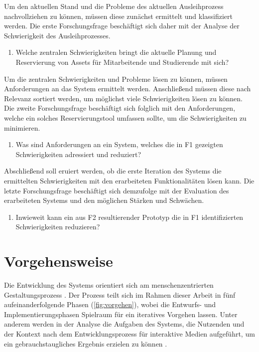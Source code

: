 Um den aktuellen Stand und die Probleme des aktuellen Ausleihprozess nachvollziehen zu können,
müssen diese zunächst ermittelt und klassifiziert werden. Die erste Forschungsfrage beschäftigt sich
daher mit der Analyse der Schwierigkeit des Ausleihprozesses.
\begin{enumerate}
  \item[\sffamily\color{maincolor} {F1 |}] {Welche zentralen Schwierigkeiten bringt die aktuelle Planung und Reservierung von Assets für Mitarbeitende und Studierende mit sich?}
\end{enumerate}
Um die zentralen Schwierigkeiten und Probleme lösen zu können, müssen Anforderungen an das System
ermittelt werden. Anschließend müssen diese nach Relevanz sortiert werden, um möglichst viele
Schwierigkeiten lösen zu können. Die zweite Forschungsfrage beschäftigt sich folglich mit den
Anforderungen, welche ein solches Reservierungstool umfassen sollte, um die Schwierigkeiten zu minimieren.
\begin{enumerate}
  \item[\sffamily\color{maincolor} {F2 |}] {Was sind Anforderungen an ein System, welches die in F1 gezeigten Schwierigkeiten adressiert und reduziert?}
\end{enumerate}
Abschließend soll eruiert werden, ob die erste Iteration des Systems die ermittelten Schwierigkeiten
mit den erarbeiteten Funktionalitäten lösen kann. Die letzte Forschungsfrage beschäftigt sich
demzufolge mit der Evaluation des erarbeiteten Systems und den möglichen Stärken und Schwächen.
\begin{enumerate}
  \item[\sffamily\color{maincolor} {F3 |}] {Inwieweit kann ein aus F2 resultierender Prototyp die in F1 identifizierten Schwierigkeiten reduzieren?}
\end{enumerate}

\section{Vorgehensweise}
Die Entwicklung des Systems orientiert sich am menschenzentrierten Gestaltungsprozess
\cite{DINISO9241}. Der Prozess teilt sich im Rahmen dieser Arbeit in
fünf aufeinanderfolgende Phasen (\ref{fig:vorgehen}), wobei die Entwurfs- und Implementierungsphasen
Spielraum für ein iteratives Vorgehen lassen. Unter anderem werden in der Analyse die Aufgaben des
Systems, die Nutzenden und der Kontext nach dem Entwicklungsprozess für interaktive Medien
aufgeführt, um ein gebrauchstaugliches Ergebnis erzielen zu können \cite{HerczegMDI2009}.

